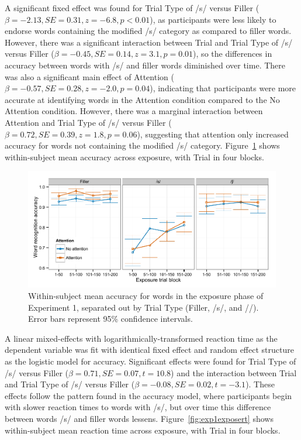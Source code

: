A significant fixed effect was found for Trial Type of /s/ versus Filler ($\beta = -2.13, SE = 0.31, z = -6.8, p < 0.01$), as participants were less likely to endorse words containing the modified /s/ category as compared to filler words.
However, there was a significant interaction between Trial and Trial Type of /s/ versus Filler ($\beta = -0.45, SE = 0.14, z = 3.1, p = 0.01$), so the differences in accuracy between words with /s/ and filler words diminished over time.
There was also a significant main effect of Attention ($\beta = -0.57, SE = 0.28, z = -2.0, p = 0.04$), indicating that participants were more accurate at identifying words in the Attention condition compared to the No Attention condition.
However, there was a marginal interaction between Attention and Trial Type of /s/ versus Filler ($\beta = 0.72, SE = 0.39, z = 1.8, p = 0.06$), suggesting that attention only increased accuracy for words not containing the modified /s/ category.
Figure~\ref{fig:exp1exposeacc} shows within-subject mean accuracy across exposure, with Trial in four blocks.

\begin{figure}[!ht]
\caption{Within-subject mean accuracy for words in the exposure phase of Experiment 1, separated out by Trial Type (Filler, /s/, and /\textesh/). Error bars represent 95\% confidence intervals.}
\label{fig:exp1exposeacc}
\begin{center}
\includegraphics[width=\textwidth]{graphs/exp1_expacc}
\end{center}
\end{figure}

A linear mixed-effects with logarithmically-transformed reaction time as the dependent variable was fit with identical fixed effect and random effect structure as the logistic model for accuracy.
Significant effects were found for Trial Type of /s/ versus Filler ($\beta = 0.71, SE = 0.07, t = 10.8$) and the interaction between Trial and Trial Type of /s/ versus Filler ($\beta = -0.08, SE = 0.02, t = -3.1$).  
These effects follow the pattern found in the accuracy model, where participants begin with slower reaction times to words with /s/, but over time this difference between words /s/ and filler words lessens.  
Figure~\ref{fig:exp1exposert} shows within-subject mean reaction time across exposure, with Trial in four blocks.

